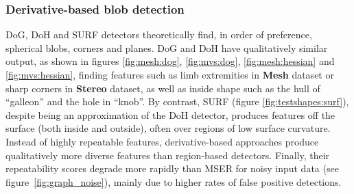 \subsubsection{Derivative-based blob detection} DoG, DoH and SURF detectors theoretically find, in order of preference, spherical blobs, corners and planes. DoG and DoH have qualitatively similar output, as shown in figures \ref{fig:mesh:dog}, \ref{fig:mvs:dog}, \ref{fig:mesh:hessian} and \ref{fig:mvs:hessian}, finding features such as limb extremities in \textbf{Mesh} dataset or sharp corners in \textbf{Stereo} dataset, as well as inside shape such as the hull of ``galleon'' and the hole in ``knob''. By contrast, SURF (figure \ref{fig:testshapes:surf}), despite being an approximation of the DoH detector, produces features off the surface (both inside and outside), often over regions of low surface curvature. Instead of highly repeatable features, derivative-based approaches produce qualitatively more diverse features than region-based detectors. Finally, their repeatability scores degrade more rapidly than MSER for noisy input data (see figure~\ref{fig:graph_noise}), mainly due to higher rates of false positive detections. 

